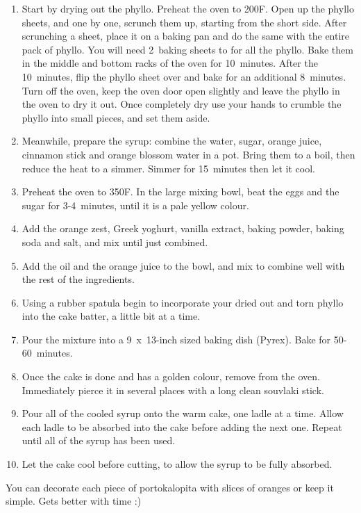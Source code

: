 \begin{enumerate}
    \item Start by drying out the phyllo. Preheat the oven to 200\degree F. Open up the phyllo sheets, and one by one, scrunch them up, starting from the short side. After scrunching a sheet, place it on a baking pan and do the same with the entire pack of phyllo. You will need 2~baking sheets to for all the phyllo. Bake them in the middle and bottom racks of the oven for 10~minutes. After the 10~minutes, flip the phyllo sheet over and bake for an additional 8~minutes. Turn off the oven, keep the oven door open slightly and leave the phyllo in the oven to dry it out. Once completely dry use your hands to crumble the phyllo into small pieces, and set them aside.
    \item Meanwhile, prepare the syrup: combine the water, sugar, orange juice, cinnamon stick and orange blossom water in a pot. Bring them to a boil, then reduce the heat to a simmer. Simmer for 15~minutes then let it cool.
    \item Preheat the oven to 350\degree F. In the large mixing bowl, beat the eggs and the sugar for 3-4~minutes, until it is a pale yellow colour.
    \item Add the orange zest, Greek yoghurt, vanilla extract, baking powder, baking soda and salt, and mix until just combined.
    \item Add the oil and the orange juice to the bowl, and mix to combine well with the rest of the ingredients.
    \item Using a rubber spatula begin to incorporate your dried out and torn phyllo into the cake batter, a little bit at a time.
    \item Pour the mixture into a 9~x~13-inch sized baking dish (Pyrex). Bake for 50-60~minutes.
    \item Once the cake is done and has a golden colour, remove from the oven. Immediately pierce it in several places with a long clean souvlaki stick.
    \item Pour all of the cooled syrup onto the warm cake, one ladle at a time. Allow each ladle to be absorbed into the cake before adding the next one. Repeat until all of the syrup has been used.
    \item Let the cake cool before cutting, to allow the syrup to be fully absorbed.
\end{enumerate}

You can decorate each piece of portokalopita with slices of oranges or keep it simple. Gets better with time :)


